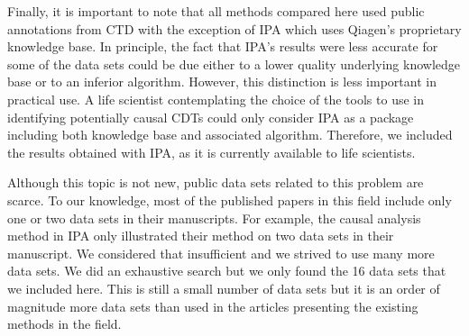 Finally, it is important to note that all methods compared here used public annotations from CTD with the exception of IPA which uses Qiagen's proprietary knowledge base. In principle, the fact that IPA's results were less accurate for some of the data sets could be due either to a lower quality underlying knowledge base or to an inferior algorithm. However, this distinction is less important in practical use. A life scientist contemplating the choice of the tools to use in identifying potentially causal CDTs could only consider IPA as a package including both knowledge base and associated algorithm. Therefore, we included the results obtained with IPA, as it is currently available to life scientists. 

Although this topic is not new, public data sets related to this problem are scarce. To our knowledge, most of the published papers in this field include only one or two data sets in their manuscripts. For example, the causal analysis method in IPA only illustrated their method on two data sets in their manuscript. We considered that insufficient and we strived to use many more data sets. We did an exhaustive search but we only found the 16 data sets that we included here. This is still a small number of data sets but it is an order of magnitude more data sets than used in the articles presenting the existing methods in the field.



%
% 


